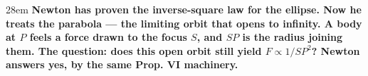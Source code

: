 \documentclass[border=4pt]{standalone}
\begin{document}
\begin{varwidth}{28em}
\large\bfseries
Newton has proven the inverse-square law for the ellipse. Now he treats      the parabola — the limiting orbit that opens to infinity. A body at $P$      feels a force drawn to the focus $S$, and $SP$ is the radius      joining them. The question: does this open orbit still yield $F \propto 1/SP^2$?      Newton answers yes, by the same Prop. VI machinery.
\end{varwidth}
\end{document}
